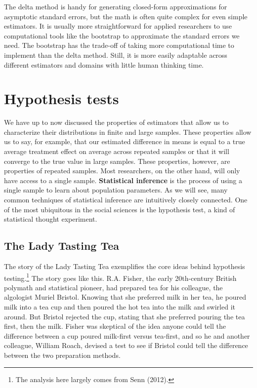 \documentclass[
  letterpaper,
  DIV=11,
  numbers=noendperiod]{scrreprt}
\theoremstyle{definition}
\theoremstyle{definition}
\theoremstyle{plain}
\theoremstyle{remark}
\begin{document}
The delta method is handy for generating closed-form approximations for
asymptotic standard errors, but the math is often quite complex for even
simple estimators. It is usually more straightforward for applied
researchers to use computational tools like the bootstrap to approximate
the standard errors we need. The bootstrap has the trade-off of taking
more computational time to implement than the delta method. Still, it is
more easily adaptable across different estimators and domains with
little human thinking time.

\hypertarget{hypothesis-tests}{%
\chapter{Hypothesis tests}\label{hypothesis-tests}}

We have up to now discussed the properties of estimators that allow us
to characterize their distributions in finite and large samples. These
properties allow us to say, for example, that our estimated difference
in means is equal to a true average treatment effect on average across
repeated samples or that it will converge to the true value in large
samples. These properties, however, are properties of repeated samples.
Most researchers, on the other hand, will only have access to a single
sample. \textbf{Statistical inference} is the process of using a single
sample to learn about population parameters. As we will see, many common
techniques of statistical inference are intuitively closely connected.
One of the most ubiquitous in the social sciences is the hypothesis
test, a kind of statistical thought experiment.

\hypertarget{the-lady-tasting-tea}{%
\section{The Lady Tasting Tea}\label{the-lady-tasting-tea}}

The story of the Lady Tasting Tea exemplifies the core ideas behind
hypothesis testing.\footnote{The analysis here largely comes from Senn
  (2012).} The story goes like this. R.A. Fisher, the early 20th-century
British polymath and statistical pioneer, had prepared tea for his
colleague, the algologist Muriel Bristol. Knowing that she preferred
milk in her tea, he poured milk into a tea cup and then poured the hot
tea into the milk and swirled it around. But Bristol rejected the cup,
stating that she preferred pouring the tea first, then the milk. Fisher
was skeptical of the idea anyone could tell the difference between a cup
poured milk-first versus tea-first, and so he and another colleague,
William Roach, devised a test to see if Bristol could tell the
difference between the two preparation methods.
\end{document}

